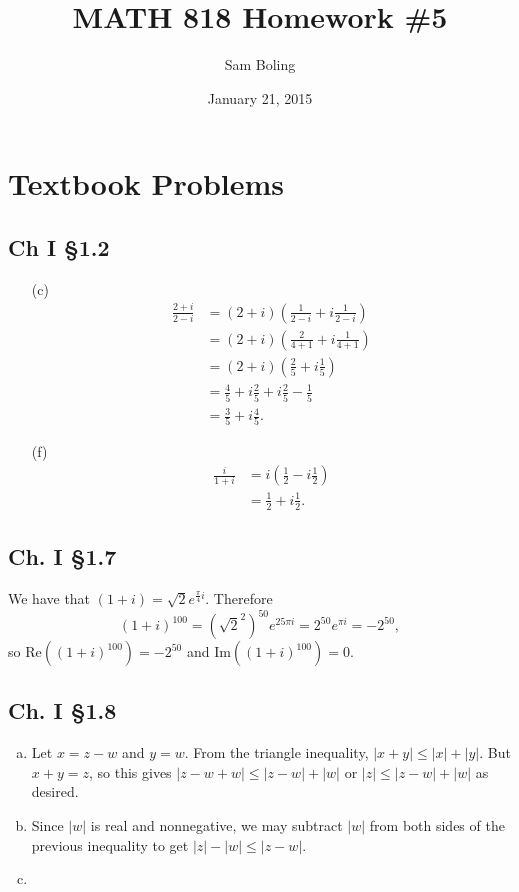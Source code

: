 \documentclass{article}
\title{MATH 818 Homework \#5}
\date{January 21, 2015}
\author{Sam Boling}
\newcounter{Problem}
\begin{document}
\begin{titlepage}
\maketitle
\end{titlepage}

\section{Textbook Problems}

\subsection*{Ch I \S 1.2}
\begin{itemize}
  \item[(c)]{
    \begin{align*}
       \frac{2 + i}{2 - i}
    &= (2+i)\left(\frac{1}{2 - i} + i\frac{1}{2 - i}\right) \\
    &= (2+i)\left(\frac{2}{4+1} + i\frac{1}{4 + 1}\right) \\
    &= (2+i)\left(\frac{2}{5} + i\frac{1}{5}\right) \\
    &= \frac{4}{5} + i\frac{2}{5} + i\frac{2}{5} - \frac{1}{5} \\
    &= \frac{3}{5} + i\frac{4}{5}.
    \end{align*}
  }
  \item[(f)]{
    \begin{align*}
       \frac{i}{1+i}
    &= i\left(\frac{1}{2} - i\frac{1}{2}\right) \\
    &= \frac{1}{2} + i\frac{1}{2}.
    \end{align*}
  }
\end{itemize}

\subsection*{Ch. I \S 1.7}
We have that $(1 + i) = \sqrt{2}e^{\frac{\pi}{4} i}$.
Therefore
$$
  (1 + i)^{100}
= (\sqrt{2}^2)^{50} e^{25 \pi i}
= 2^{50} e^{\pi i}
= -2^{50},
$$
so $\mathrm{Re}((1 + i)^{100}) = -2^{50}$ and
$\mathrm{Im}((1 + i)^{100}) = 0$.

\subsection*{Ch. I \S 1.8}
\begin{enumerate}[(a)]
  \item{
    Let $x = z - w$ and $y = w$. From the triangle inequality,
    $|x + y| \leq |x| + |y|$. But $x + y = z$, so this gives
    $|z - w + w| \leq |z - w| + |w|$ or $|z| \leq |z - w| + |w|$ as
    desired.
  }
  \item{
    Since $|w|$ is real and nonnegative, we may subtract $|w|$ from
    both sides of the previous inequality to get $|z| - |w| \leq |z - w|$.
  }
  \item{
    \begin{align*}
    \end{align*}
  }
\end{enumerate}
\end{document}
